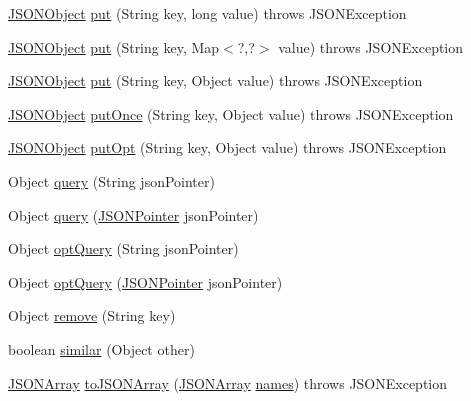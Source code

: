 \begin{DoxyCompactItemize}
\item 
\hyperlink{classorg_1_1json_1_1JSONObject}{J\-S\-O\-N\-Object} \hyperlink{classorg_1_1json_1_1JSONObject_a5807cd038e9ae979a692db1b99461205}{put} (String key, long value)  throws J\-S\-O\-N\-Exception 
\item 
\hyperlink{classorg_1_1json_1_1JSONObject}{J\-S\-O\-N\-Object} \hyperlink{classorg_1_1json_1_1JSONObject_ae2efab9c8dd3029750be85e6fd43dddc}{put} (String key, Map$<$?,?$>$ value)  throws J\-S\-O\-N\-Exception 
\item 
\hyperlink{classorg_1_1json_1_1JSONObject}{J\-S\-O\-N\-Object} \hyperlink{classorg_1_1json_1_1JSONObject_a2af440c4653ad8a23b0ac5ded37cd4d5}{put} (String key, Object value)  throws J\-S\-O\-N\-Exception 
\item 
\hyperlink{classorg_1_1json_1_1JSONObject}{J\-S\-O\-N\-Object} \hyperlink{classorg_1_1json_1_1JSONObject_ac6cc7fe095a7711be90f2e02163ef49e}{put\-Once} (String key, Object value)  throws J\-S\-O\-N\-Exception 
\item 
\hyperlink{classorg_1_1json_1_1JSONObject}{J\-S\-O\-N\-Object} \hyperlink{classorg_1_1json_1_1JSONObject_a023672439a8c851a663a183120fc126e}{put\-Opt} (String key, Object value)  throws J\-S\-O\-N\-Exception 
\item 
Object \hyperlink{classorg_1_1json_1_1JSONObject_ae78919e793b1e545f6b146d1d526dae1}{query} (String json\-Pointer)
\item 
Object \hyperlink{classorg_1_1json_1_1JSONObject_a48e5986121273fefaba4cd85fa8ed521}{query} (\hyperlink{classorg_1_1json_1_1JSONPointer}{J\-S\-O\-N\-Pointer} json\-Pointer)
\item 
Object \hyperlink{classorg_1_1json_1_1JSONObject_a62ad8bc6bf63791326ab16339359e71c}{opt\-Query} (String json\-Pointer)
\item 
Object \hyperlink{classorg_1_1json_1_1JSONObject_a33a5e800ffb58b0de4336f0aad9bc703}{opt\-Query} (\hyperlink{classorg_1_1json_1_1JSONPointer}{J\-S\-O\-N\-Pointer} json\-Pointer)
\item 
Object \hyperlink{classorg_1_1json_1_1JSONObject_af4faca830e4bb6a00bccad695bd58c4d}{remove} (String key)
\item 
boolean \hyperlink{classorg_1_1json_1_1JSONObject_aafd339041f6c72c195769e4cd4ef6daf}{similar} (Object other)
\item 
\hyperlink{classorg_1_1json_1_1JSONArray}{J\-S\-O\-N\-Array} \hyperlink{classorg_1_1json_1_1JSONObject_acafa0ef1407022894738177b3195e9f3}{to\-J\-S\-O\-N\-Array} (\hyperlink{classorg_1_1json_1_1JSONArray}{J\-S\-O\-N\-Array} \hyperlink{classorg_1_1json_1_1JSONObject_a02e83de70e290231527d1760c4dd30fc}{names})  throws J\-S\-O\-N\-Exception 

\end{DoxyCompactItemize}
